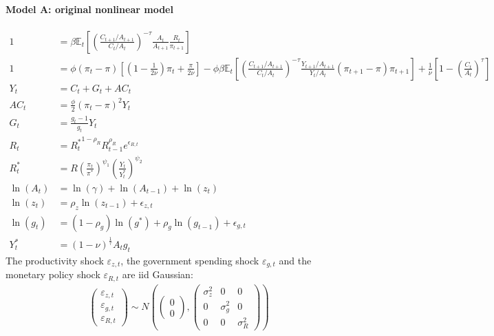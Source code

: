 \paragraph{Model A: original nonlinear model}
\begin{align}
1 &= \beta \mathbb{E}_t\left[\left(\frac{C_{t+1}/A_{t+1}}{C_t/A_t}\right)^{-\tau} \frac{A_t}{A_{t+1}} \frac{R_t}{\pi_{t+1}}\right]
\\
1 &= \phi \left(\pi_t - \pi\right) \left[\left(1-\frac{1}{2\nu}\right)\pi_t + \frac{\pi}{2\nu}\right] - \phi \beta \mathbb{E}_t \left[\left(\frac{C_{t+1}/A_{t+1}}{C_t/A_t}\right)^{-\tau} \frac{Y_{t+1}/A_{t+1}}{Y_t/A_t} \left(\pi_{t+1} - \pi \right) \pi_{t+1}\right] + \frac{1}{\nu}\left[1-\left({\frac{C_t}{A_t}}\right)^{\tau}\right]
\\
Y_t &= C_t + G_t + AC_t
\\
AC_t &= \frac{\phi}{2} \left({\pi_t - \pi}\right)^2 Y_t
\\
G_t &= \frac{g_t-1}{g_t} Y_t
\\
R_t &= {R_t^{*}}^{1-\rho_R} R_{t-1}^{\rho_R} e^{\epsilon_{R,t}}
\\
R_t^* & = R \left(\frac{\pi_t}{\pi^*}\right)^{\psi_1} \left(\frac{Y_t}{Y_t^*}\right)^{\psi_2}
\\
\ln(A_t) &= \ln(\gamma) + \ln(A_{t-1}) + \ln(z_t)
\\
\ln(z_t) &= \rho_z \ln(z_{t-1}) + \epsilon_{z,t}
\\
\ln(g_t) &= (1-\rho_g)\ln(g^*) + \rho_g \ln(g_{t-1}) + \epsilon_{g,t}
\\
Y_t^* &= (1-\nu)^{\frac{1}{\tau}} A_t g_t
\end{align}
The productivity shock $\varepsilon_{z,t}$, the government spending shock $\varepsilon_{g,t}$ and the monetary policy shock $\varepsilon_{R,t}$ are iid Gaussian:
\begin{align*}
\begin{pmatrix}
\varepsilon_{z,t}\\\varepsilon_{g,t}\\\varepsilon_{R,t}
\end{pmatrix}
\sim N\left(\begin{pmatrix} 0\\0\end{pmatrix}, \begin{pmatrix} \sigma_z^2 & 0 & 0\\0 & \sigma_{g}^2 &0 \\ 0 & 0 & \sigma_R^2\end{pmatrix}\right)
\end{align*}

